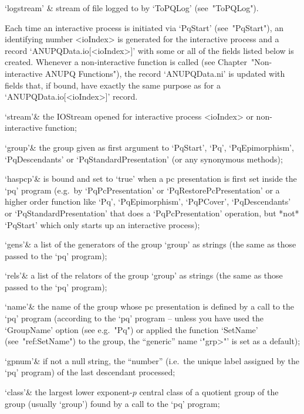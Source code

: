 \quad`logstream' & stream of file logged to by `ToPQLog' (see~"ToPQLog").

\enditems

Each time an interactive {\ANUPQ}  process  is  initiated  via  `PqStart'
(see~"PqStart"), an identifying number <ioIndex>  is  generated  for  the
interactive process and a record `ANUPQData.io[<ioIndex>]' with  some  or
all of the fields listed below is  created.  Whenever  a  non-interactive
function is called (see Chapter~"Non-interactive ANUPQ  Functions"),  the
record `ANUPQData.ni' is updated with fields that, if bound, have exactly
the same purpose as for a `ANUPQData.io[<ioIndex>]' record. 

\beginitems

\quad`stream'& the  IOStream  opened  for  interactive  {\ANUPQ}  process
<ioIndex> or non-interactive {\ANUPQ} function;

\quad`group'& the group given  as  first  argument  to  `PqStart',  `Pq',
`PqEpimorphism',  `PqDescendants'  or  `PqStandardPresentation'  (or  any
synonymous methods);

\quad`haspcp'& is bound and set to `true' when a pc presentation is first
set   inside   the   `pq'   program   (e.g.~by   `PqPcPresentation'    or
`PqRestorePcPresentation'  or  a  higher  order   function   like   `Pq',
`PqEpimorphism', `PqPCover', `PqDescendants' or  `PqStandardPresentation'
that does a `PqPcPresentation' operation, but *not* `PqStart' which  only
starts up an interactive {\ANUPQ} process);

\quad`gens'& a list of the generators of the  group  `group'  as  strings
(the same as those passed to the `pq' program);

\quad`rels'& a list of the relators of the group `group' as strings  (the
same as those passed to the `pq' program);

\quad`name'& the name of the group whose pc presentation is defined by  a
call to the `pq' program (according to the `pq'  program  --  unless  you
have used the `GroupName' option (see e.g.~"Pq") or applied the  function
`SetName'  (see~"ref:SetName")  to  the  group,  the   ``generic''   name
`"\<grp>"' is set as a default);

\quad`gpnum'& if not a null string, the ``number'' (i.e.~the unique label
assigned by the `pq' program) of the last descendant processed;

\quad`class'& the largest lower exponent-$p$ central class of a  quotient
group of the group (usually `group') found by a call to the `pq' program;


